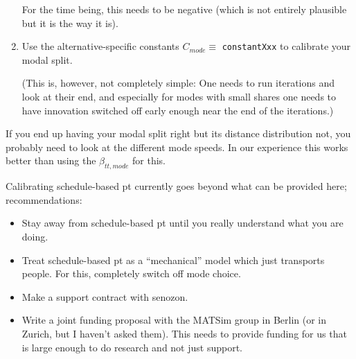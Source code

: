 \begin{enumerate}
For the time being, this needs to be negative (which is not entirely plausible but it is the way it is).

\item Use the alternative-specific constants $C_{mode} \equiv$ \verb$constantXxx$ to calibrate your modal split.

(This is, however, not completely simple: One needs to run iterations and look at their end, and especially for modes with small shares one needs to have innovation switched off early enough near the end of the iterations.)

\end{enumerate}

If you end up having your modal split right but its distance distribution not, you probably need to look at the different mode speeds.  In our experience this works better than using the $\beta_{tt,mode}$ for this.

Calibrating schedule-based pt currently goes beyond what can be provided here; recommendations:
\begin{itemize}

\item Stay away from schedule-based pt until you really understand what you are doing.

\item Treat schedule-based pt as a ``mechanical'' model which just transports people.  For this, completely switch off mode choice.

\item Make a support contract with senozon.

\item Write a joint funding proposal with the MATSim group in Berlin (or in Zurich, but I haven't asked them).  This needs to provide funding for us that is large enough to do research and not just support.

\end{itemize}



